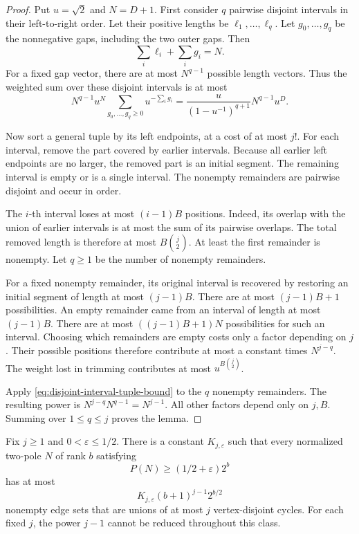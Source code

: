 \begin{proof}
Put $u=\sqrt2$ and $N=D+1$.
First consider $q$ pairwise disjoint intervals in their left-to-right order.
Let their positive lengths be $\ell_1,\ldots,\ell_q$.
Let $g_0,\ldots,g_q$ be the nonnegative gaps, including the two outer gaps.
Then
\[
 \sum_i\ell_i+\sum_i g_i=N.
\]
For a fixed gap vector, there are at most $N^{q-1}$ possible length vectors.
Thus the weighted sum over these disjoint intervals is at most
\begin{equation}\label{eq:disjoint-interval-tuple-bound}
 N^{q-1}u^N\sum_{g_0,\ldots,g_q\ge0}u^{-\sum_i g_i}
 =\frac{u}{(1-u^{-1})^{q+1}}N^{q-1}u^D.
\end{equation}

Now sort a general tuple by its left endpoints, at a cost of at most $j!$.
For each interval, remove the part covered by earlier intervals.
Because all earlier left endpoints are no larger, the removed part is an initial segment.
The remaining interval is empty or is a single interval.
The nonempty remainders are pairwise disjoint and occur in order.

The $i$-th interval loses at most $(i-1)B$ positions.
Indeed, its overlap with the union of earlier intervals is at most the sum of its pairwise overlaps.
The total removed length is therefore at most $B\binom j2$.
At least the first remainder is nonempty.
Let $q\ge1$ be the number of nonempty remainders.

For a fixed nonempty remainder, its original interval is recovered by restoring an initial segment of length at most $(j-1)B$.
There are at most $(j-1)B+1$ possibilities.
An empty remainder came from an interval of length at most $(j-1)B$.
There are at most $((j-1)B+1)N$ possibilities for such an interval.
Choosing which remainders are empty costs only a factor depending on $j$.
Their possible positions therefore contribute at most a constant times $N^{j-q}$.
The weight lost in trimming contributes at most $u^{B\binom j2}$.

Apply \eqref{eq:disjoint-interval-tuple-bound} to the $q$ nonempty remainders.
The resulting power is $N^{j-q}N^{q-1}=N^{j-1}$.
All other factors depend only on $j,B$.
Summing over $1\le q\le j$ proves the lemma.
\end{proof}

\begin{theorem}
\label{thm:fixed-component-high-path-packings}
Fix $j\ge1$ and $0<\varepsilon\le1/2$.
There is a constant $K_{j,\varepsilon}$ such that every normalized two-pole $N$ of rank $b$ satisfying
\[
 P(N)\ge(1/2+\varepsilon)2^b
\]
has at most
\[
 K_{j,\varepsilon}(b+1)^{j-1}2^{b/2}
\]
nonempty edge sets that are unions of at most $j$ vertex-disjoint cycles.
For each fixed $j$, the power $j-1$ cannot be reduced throughout this class.
\end{theorem}

